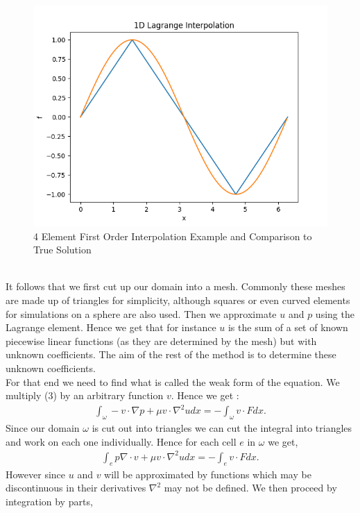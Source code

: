 \documentclass[11pt,twoside,a4paper]{article}
\begin{document}
\begin{figure}
  \includegraphics[width=\linewidth]{ex_1D_LG.png}
  \caption{4 Element First Order Interpolation Example and Comparison to True Solution}
\end{figure}
\\
It follows that we first cut up our domain into a mesh. Commonly these meshes are made up of triangles for simplicity, although squares or even curved elements for simulations on a sphere are also used. Then we approximate $u$ and $p$ using the Lagrange element. Hence we get that for instance $u$ is the sum of a set of known piecewise linear functions (as they are determined by the mesh) but with unknown coefficients. The aim of the rest of the method is to determine these unknown coefficients.\\
For that end we need to find what is called the weak form of the equation. We multiply (3) by an arbitrary function $v$. Hence we get :
\begin{align*}
\int_{\omega} -v \cdot \nabla p + \mu v \cdot \nabla^2 u dx = -\int_{\omega} v \cdot F dx .
\end{align*}
Since our domain $\omega$ is cut out into triangles we can cut the integral into triangles and work on each one individually. Hence for each cell $e$ in $\omega$ we get,
\begin{align*}
\int_{e} p \nabla \cdot v + \mu v \cdot \nabla^2 u dx =  -\int_{e} v \cdot F dx .
\end{align*}
However since $u$ and $v$ will be approximated by functions which may be discontinuous in their derivatives $\nabla^2$ may not be defined. We then proceed by integration by parts,
\end{document}
